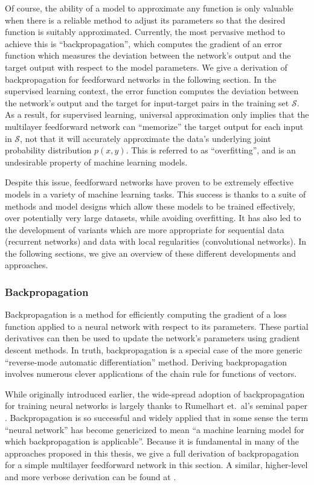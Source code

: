 Of course, the ability of a model to approximate any function is only valuable when there is a reliable method to adjust its parameters so that the desired function is suitably approximated.
Currently, the most pervasive method to achieve this is ``backpropagation'', which computes the gradient of an error function which measures the deviation between the network's output and the target output with respect to the model parameters.
We give a derivation of backpropagation for feedforward networks in the following section.
In the supervised learning context, the error function computes the deviation between the network's output and the target for input-target pairs in the training set $\mathcal{S}$.
As a result, for supervised learning, universal approximation only implies that the multilayer feedforward network can ``memorize'' the target output for each input in $\mathcal{S}$, not that it will accurately approximate the data's underlying joint probability distribution $p(x, y)$.
This is referred to as ``overfitting'', and is an undesirable property of machine learning models.

Despite this issue, feedforward networks have proven to be extremely effective models in a variety of machine learning tasks.
This success is thanks to a suite of methods and model designs which allow these models to be trained effectively, over potentially very large datasets, while avoiding overfitting.
It has also led to the development of variants which are more appropriate for sequential data (recurrent networks) and data with local regularities (convolutional networks).
In the following sections, we give an overview of these different developments and approaches.

\subsubsection{Backpropagation}

Backpropagation is a method for efficiently computing the gradient of a loss function applied to a neural network with respect to its parameters.
These partial derivatives can then be used to update the network's parameters using gradient descent methods.
In truth, backpropagation is a special case of the more generic ``reverse-mode automatic differentiation'' method.
Deriving backpropagation involves numerous clever applications of the chain rule for functions of vectors.

While originally introduced earlier, the wide-spread adoption of backpropagation for training neural networks is largely thanks to Rumelhart et.\ al's seminal paper \cite{}.
Backpropagation is so successful and widely applied that in some sense the term ``neural network'' has become genericized to mean ``a machine learning model for which backpropagation is applicable''.
Because it is fundamental in many of the approaches proposed in this thesis, we give a full derivation of backpropagation for a simple multilayer feedforward network in this section.
A similar, higher-level and more verbose derivation can be found at \cite{}.

